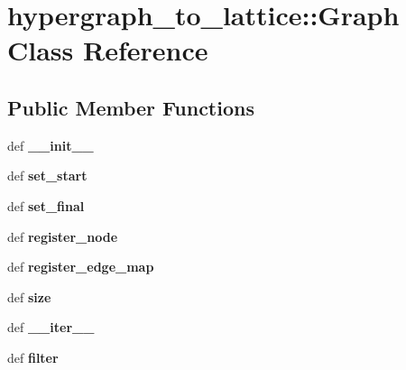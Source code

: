 \hypertarget{classhypergraph__to__lattice_1_1Graph}{
\section{hypergraph\_\-to\_\-lattice::Graph Class Reference}
\label{classhypergraph__to__lattice_1_1Graph}
}
\subsection*{Public Member Functions}
\begin{DoxyCompactItemize}
\item 
\hypertarget{classhypergraph__to__lattice_1_1Graph_a1a259313b204283afb1dac1823f5a7f6}{
def {\bfseries \_\-\_\-init\_\-\_\-}}
\label{classhypergraph__to__lattice_1_1Graph_a1a259313b204283afb1dac1823f5a7f6}

\item 
\hypertarget{classhypergraph__to__lattice_1_1Graph_af79ad1a1e908e784f034c295afa95190}{
def {\bfseries set\_\-start}}
\label{classhypergraph__to__lattice_1_1Graph_af79ad1a1e908e784f034c295afa95190}

\item 
\hypertarget{classhypergraph__to__lattice_1_1Graph_a2f45654cef23905bc398fa6c411c3b3b}{
def {\bfseries set\_\-final}}
\label{classhypergraph__to__lattice_1_1Graph_a2f45654cef23905bc398fa6c411c3b3b}

\item 
\hypertarget{classhypergraph__to__lattice_1_1Graph_afe7cd51883a0a18a0f943a6858dc6c06}{
def {\bfseries register\_\-node}}
\label{classhypergraph__to__lattice_1_1Graph_afe7cd51883a0a18a0f943a6858dc6c06}

\item 
\hypertarget{classhypergraph__to__lattice_1_1Graph_a0de76e7735e963556a163730da35556a}{
def {\bfseries register\_\-edge\_\-map}}
\label{classhypergraph__to__lattice_1_1Graph_a0de76e7735e963556a163730da35556a}

\item 
\hypertarget{classhypergraph__to__lattice_1_1Graph_ae740d42a275c42f669603d25282a993d}{
def {\bfseries size}}
\label{classhypergraph__to__lattice_1_1Graph_ae740d42a275c42f669603d25282a993d}

\item 
\hypertarget{classhypergraph__to__lattice_1_1Graph_a53c1c5a0d1e64f1fff5f3e9ac1d09a57}{
def {\bfseries \_\-\_\-iter\_\-\_\-}}
\label{classhypergraph__to__lattice_1_1Graph_a53c1c5a0d1e64f1fff5f3e9ac1d09a57}

\item 
\hypertarget{classhypergraph__to__lattice_1_1Graph_ab46ee61af55d7dca0d566a9d7edb581a}{
def {\bfseries filter}}
\label{classhypergraph__to__lattice_1_1Graph_ab46ee61af55d7dca0d566a9d7edb581a}

\end{DoxyCompactItemize}
